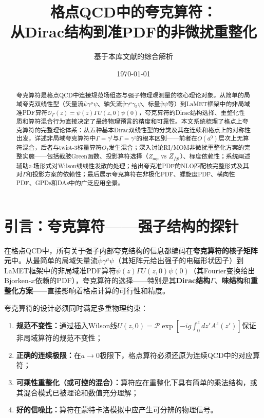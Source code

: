 \documentclass[12pt,a4paper]{ctexart}
\title{\heiti 格点QCD中的夸克算符：\\
从Dirac结构到准PDF的非微扰重整化}
\author{基于本库文献的综合解析}
\date{\today}
\theoremstyle{definition}
\begin{document}
\maketitle

\begin{abstract}
\noindent
夸克算符是格点QCD中连接规范场组态与强子物理观测量的核心理论对象。从简单的局域夸克双线性型（矢量流$\bar{\psi}\gamma^\mu\psi$、轴矢流$\bar{\psi}\gamma^\mu\gamma_5\psi$、标量$\bar{\psi}\psi$等）到LaMET框架中的非局域准PDF算符$\mathcal{O}_\Gamma(z) = \bar{\psi}(z)\Gamma U(z,0)\psi(0)$，夸克算符的Dirac结构选择、重整化性质和算符混合行为直接决定了最终物理预言的精度和可靠性。本文系统梳理了格点上夸克算符的完整理论体系：从五种基本Dirac双线性型的分类及其在连续和格点上的对称性出发，详述非局域夸克算符中$\Gamma = \gamma^t$与$\Gamma = \gamma^z$的根本区别——前者在$O(a^0)$层次上无算符混合，后者与twist-3标量算符$O_I$发生混合；深入讨论RI/MOM非微扰重整化方案的完整实施——包括截肢Green函数、投影算符选择（$Z_{\text{mp}}$ vs $Z_{/\mskip-1mu p}$）、标度依赖性；系统阐述辅助$z$-场形式对Wilson线线性发散的处理；给出夸克准PDF的NLO匹配核完整形式及其对$\Gamma$和投影方案的依赖性；最后展示夸克算符在非极化PDF、螺旋度PDF、横向性PDF、GPDs和DAs中的广泛应用全景。
\end{abstract}

\tableofcontents
\newpage

\section{引言：夸克算符——强子结构的探针}

在格点QCD中，所有关于强子内部夸克结构的信息都编码在\textbf{夸克算符的核子矩阵元}中。从最简单的局域矢量流$\bar{\psi}\gamma^\mu\psi$（其矩阵元给出强子的电磁形状因子）到LaMET框架中的非局域准PDF算符$\bar{\psi}(z)\Gamma U(z,0)\psi(0)$（其Fourier变换给出Bjorken-$x$依赖的PDF），夸克算符的选择——特别是其\textbf{Dirac结构}$\Gamma$、\textbf{味结构}和\textbf{重整化方案}——直接影响着格点计算的可行性和精度。

夸克算符的设计必须同时满足多重物理约束\cite{Liu2019isovector,Alexandrou2017,Chen2016improved}：

\begin{enumerate}
    \item \textbf{规范不变性：}通过插入Wilson线$U(z,0) = \mathcal{P}\exp[-ig\int_0^z dz' A^z(z')]$保证非局域算符的规范不变性；
    \item \textbf{正确的连续极限：}在$a \to 0$极限下，格点算符必须还原为连续QCD中的对应算符；
    \item \textbf{可乘性重整化（或可控的混合）：}算符应在重整化下具有简单的乘法结构，或其混合模式已被理论和数值充分理解；
    \item \textbf{好的信噪比：}算符在蒙特卡洛模拟中应产生可分辨的物理信号。
\end{enumerate}
\end{document}
